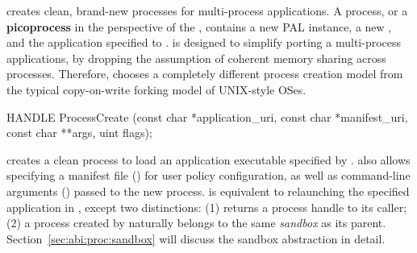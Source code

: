 \Thehostabi{} creates clean, brand-new processes
for multi-process applications.
A process, or a {\bf picoprocess} in the perspective of the \libos{}, contains a new PAL instance,
a new \libos{},
and the application specified to \thehostabi{}.
\Thehostabi{} is designed to simplify porting a multi-process applications,
by dropping the assumption of
coherent memory sharing across processes.
Therefore, \thehostabi{} chooses a completely different process creation model
from the typical copy-on-write forking model
of UNIX-style OSes.









\begin{paldef}
HANDLE ProcessCreate (const char *application_uri,
                      const char *manifest_uri,
                      const char **args, uint flags);
\end{paldef}


 creates a clean process to load an application executable specified by
. %
 also allows specifying a manifest file () for user policy configuration, as well as command-line arguments () passed to the new process.
 is equivalent to
relaunching the specified application in \graphene{},
except two distinctions: (1)  returns a process handle to its caller;
(2) a process created by  naturally belongs to the same {\em sandbox} as its parent.
Section~\ref{sec:abi:proc:sandbox} will discuss the sandbox abstraction in detail.




